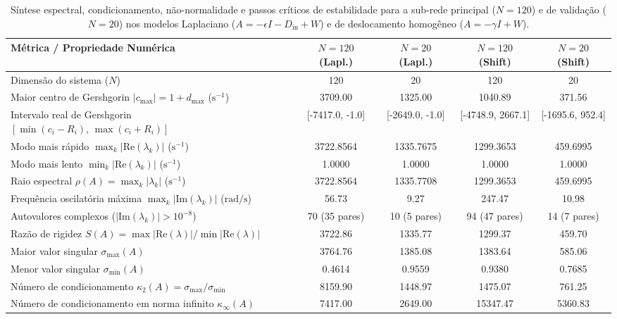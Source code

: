 \begin{table}[H]
\centering
\caption{Síntese espectral, condicionamento, não-normalidade e passos críticos de estabilidade para a sub-rede principal ($N = 120$) e de validação ($N = 20$) nos modelos Laplaciano ($A = -\epsilon I - D_{\text{in}} + W$) e de deslocamento homogêneo ($A = -\gamma I + W$).}
\label{tab:espectral_condicionamento}
\footnotesize
\setlength{\tabcolsep}{4.5pt}
\begin{tabular}{@{}lcccc@{}}
\toprule
\textbf{Métrica / Propriedade Numérica} & \textbf{$N = 120$ (Lapl.)} & \textbf{$N = 20$ (Lapl.)} & \textbf{$N = 120$ (Shift)} & \textbf{$N = 20$ (Shift)} \\
\midrule
Dimensão do sistema ($N$) & 120 & 20 & 120 & 20 \\
Maior centro de Gershgorin $|c_{\max}| = 1 + d_{\max}$ ($\text{s}^{-1}$) & 3709.00 & 1325.00 & 1040.89 & 371.56 \\
Intervalo real de Gershgorin $[\min(c_i - R_i),\, \max(c_i + R_i)]$ & [-7417.0, -1.0] & [-2649.0, -1.0] & [-4748.9, 2667.1] & [-1695.6, 952.4] \\
Modo mais rápido $\max_k |\text{Re}(\lambda_k)|$ ($\text{s}^{-1}$) & 3722.8564 & 1335.7675 & 1299.3653 & 459.6995 \\
Modo mais lento $\min_k |\text{Re}(\lambda_k)|$ ($\text{s}^{-1}$) & 1.0000 & 1.0000 & 1.0000 & 1.0000 \\
Raio espectral $\rho(A) = \max_k |\lambda_k|$ ($\text{s}^{-1}$) & 3722.8564 & 1335.7708 & 1299.3653 & 459.6995 \\
Frequência oscilatória máxima $\max_k |\text{Im}(\lambda_k)|$ ($\text{rad/s}$) & 56.73 & 9.27 & 247.47 & 10.98 \\
Autovalores complexos ($|\text{Im}(\lambda_k)| > 10^{-8}$) & 70 (35 pares) & 10 (5 pares) & 94 (47 pares) & 14 (7 pares) \\
Razão de rigidez $S(A) = \max|\text{Re}(\lambda)| / \min|\text{Re}(\lambda)|$ & 3722.86 & 1335.77 & 1299.37 & 459.70 \\
Maior valor singular $\sigma_{\max}(A)$ & 3764.76 & 1385.08 & 1383.64 & 585.06 \\
Menor valor singular $\sigma_{\min}(A)$ & 0.4614 & 0.9559 & 0.9380 & 0.7685 \\
Número de condicionamento $\kappa_2(A) = \sigma_{\max}/\sigma_{\min}$ & 8159.90 & 1448.97 & 1475.07 & 761.25 \\
Número de condicionamento em norma infinito $\kappa_\infty(A)$ & 7417.00 & 2649.00 & 15347.47 & 5360.83 \\

\end{tabular}
\end{table}
